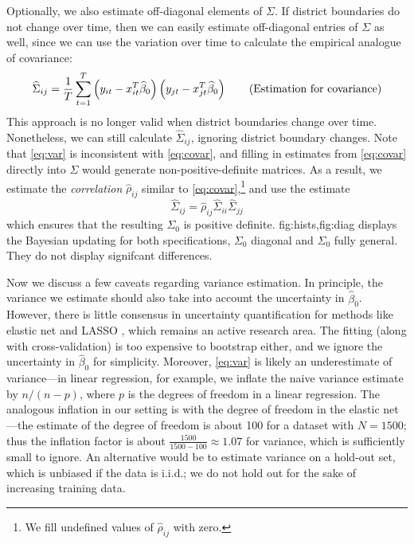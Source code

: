 \documentclass[11pt]{article}
\begin{document}
Optionally, we also estimate off-diagonal elements of $\Sigma$. If district boundaries do not change over time, then we can easily estimate off-diagonal entries of $\Sigma$ as well, since we can use the variation over time to calculate the empirical analogue of covariance: \[
\widehat \Sigma_{ij} = \frac{1}{T}\sum_{t=1}^T \left({y_{it} -x_{it}^T \widehat \beta_0}\right)\left({y_{jt} -x_{jt}^T \widehat \beta_0}\right) \tag{Estimation for covariance}
\label{eq:covar}
\]
This approach is no longer valid when district boundaries change over time. Nonetheless, we can still calculate $\hat \Sigma_{ij}$, ignoring district boundary changes.  Note that \eqref{eq:var} is inconsistent with \eqref{eq:covar}, and filling in estimates from \eqref{eq:covar} directly into $\Sigma$ would generate non-positive-definite matrices. As a result, we estimate the \emph{correlation} $\hat \rho_{ij}$ similar to \eqref{eq:covar},\footnote{We fill undefined values of $\hat \rho_{ij}$ with zero.} and use the estimate 
 \[
\hat \Sigma_{ij} = \hat \rho_{ij} \hat \Sigma_{ii} \hat \Sigma_{jj}
 \tag{Estimation for covariance with correlation}
\label{eq:covar_corr}
\]
which ensures that the resulting $\Sigma_0$ is positive definite. \Cref
{fig:hists,fig:diag} displays the Bayesian updating for both specifications,
$\Sigma_0$ diagonal and $\Sigma_0$ fully general. They do not display signifcant
differences.

Now we discuss a few caveats regarding variance estimation. In principle, the variance we estimate should also take into account the uncertainty in $\hat \beta_0$. However, there is little consensus in uncertainty quantification for methods like elastic net and LASSO \citep{kyung2010penalized}, which remains an active research area. The fitting (along with cross-validation) is too expensive to bootstrap either, and we ignore the uncertainty in $\hat \beta_0$ for simplicity. Moreover, \eqref{eq:var} is likely an underestimate of variance---in linear regression, for example, we inflate the naive variance estimate by $n/(n-p)$, where $p$ is the degrees of freedom in a linear regression. The analogous inflation in our setting is with the degree of freedom in the elastic net \citep{zou2007degrees}---the estimate of the degree of freedom is about 100 for a dataset with $N=1500$; thus the inflation factor is about $\frac{1500}{1500-100} \approx 1.07$ for variance, which is sufficiently small to ignore. An alternative would be to estimate variance on a hold-out set, which is unbiased if the data is i.i.d.; we do not hold out for the sake of increasing training data.  
\end{document}
